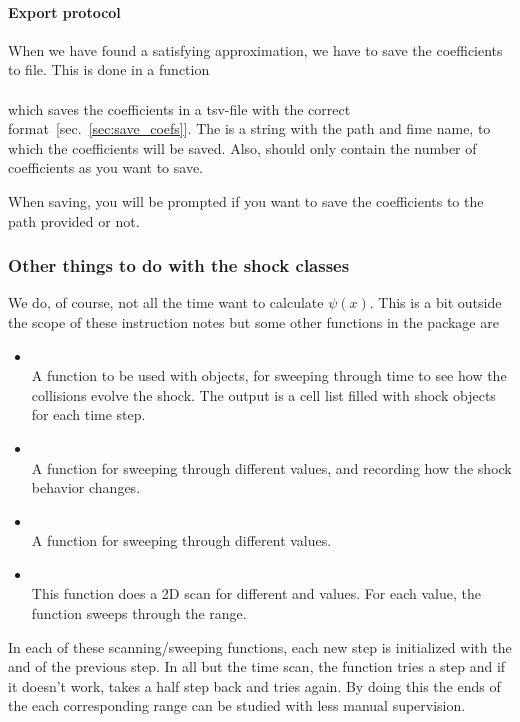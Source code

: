\documentclass[11pt,a4paper, 
swedish, english %
]{article}
\begin{document}
\paragraph{Export protocol}
When we have found a satisfying approximation, we have to save the
coefficients to file. This is done in a function\\
\indent{}\\
which saves the coefficients in a tsv-file with the correct
format~[sec.~\ref{sec:save_coefs}]. The  is a string
with the path and fime name, to which the coefficients will be
saved. Also,  should only contain the  number of
coefficients as you want to save.

When saving, you will be prompted if you want to save the coefficients
to the path provided or not.


\subsubsection{Other things to do with the shock classes}
We do, of course, not all the time want to calculate $\psi(x)$. This
is a bit outside the scope of these instruction notes but some other
functions in the  package are
\begin{itemize}
\item {}\\
A function to be used with  objects, for sweeping
through time to see how the collisions evolve the shock. The output is
a cell list filled with shock objects for each time step.
\item {}\\
A function for sweeping through different  values, and
recording how the shock behavior changes. 
\item {}\\
A function for sweeping through different  values.
\item {}\\
This function does a 2D scan for different  and
 values. For each  value, the function sweeps
through the  range.
\end{itemize}
In each of these scanning/sweeping functions, each new step is
initialized with the  and  of the previous
step. In all but the time scan, the function tries a step and if it
doesn't work, takes a half step back and tries again. By doing this
the ends of the each corresponding range can be studied with less
manual supervision.
\end{document}
